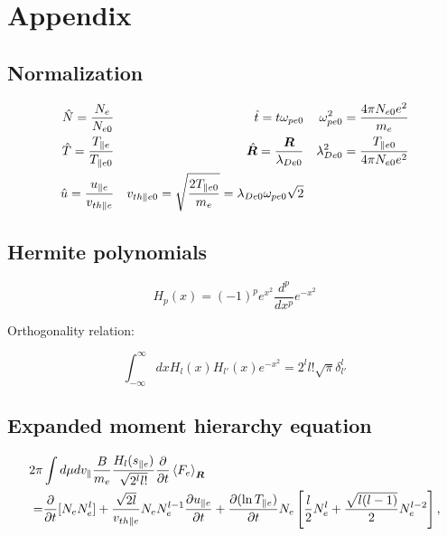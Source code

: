 \documentclass[final]{jpp}
\begin{document}
\section{Appendix}

\subsection{Normalization} \label{sec:norm}

\begin{align} \label{eq:normalization}
 \hat{N}=\frac{N_e}{N_{e0}} & &
 \hat{t}=t \omega_{pe0} &  &  \omega_{pe0}^2=\frac{4\pi N_{e0}e^2}{m_e} \\
\hat{T}=\frac{T_{\parallel e}}{T_{\parallel e0}} & & \hat{\R}=\frac{\R}{\lambda_{De0}} & & \lambda_{De0}^2=\frac{T_{\parallel e0}}{4\pi N_{e0}e^2} \\
%
\hat{u}=\frac{u_{\parallel e}}{v_{th \parallel e}} & &  v_{th \parallel e 0 }= \sqrt{\frac{2 T_{\parallel e0}}{m_e}} =  \lambda_{De0}\omega_{pe0}\sqrt{2 } & &
\end{align}

\subsection{Hermite polynomials} \label{sec:hermite}

\begin{equation} \label{eq:Hermite}
    H_p(x) = (-1)^p e^{x^2} \frac{d^p}{dx^p} e^{-x^2}
\end{equation}

Orthogonality relation:

\begin{equation} \label{eq:Hermiteorthogonality}
    \int_{-\infty}^\infty d x H_l(x) H_{l'}(x) e^{-x^2} = 2^l l! \sqrt{\pi} \delta^l_{l'}
\end{equation}



\subsection{Expanded moment hierarchy equation}

\begin{align}
2 \pi &\int d \mu d v_{\parallel} \frac{B}{m_e}\frac{H_l(s_{\parallel e})}{\sqrt{2^l l!}} \frac{\partial}{\partial t} \left< F_e \right>_{\bm{R}}  \nonumber \\
=&\frac{\partial}{\partial t}[N_e N_e^l]
+ \frac{\sqrt{2l}}{v_{th \parallel e}}  N_e N_e^{l-1} \frac{\partial u_{\parallel e}}{\partial t}
+ \frac{\partial (\ln T_{\parallel e})}{\partial t}  N_e \left[ \frac{l}{2}N_e^l+ \frac{\sqrt{l(l-1)}}{2}N_e^{l-2} \right],
\end{align}
\end{document}
